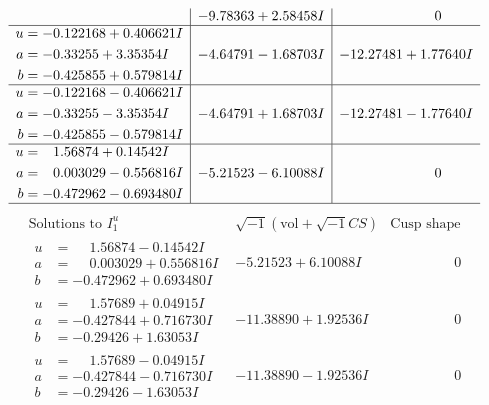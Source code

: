 \documentclass[1p]{elsarticle_modified}
\theoremstyle{definition}
\newcommand{\I}{\sqrt{-1}}
\begin{document}
$$\begin{array}{c|c|c}
 & -9.78363 + 2.58458 I & \phantom{-0.000000 } 0 \\ \hline\begin{aligned}
u &= -0.122168 + 0.406621 I \\
a &= -0.33255 + 3.35354 I \\
b &= -0.425855 + 0.579814 I\end{aligned}
 & -4.64791 - 1.68703 I & -12.27481 + 1.77640 I \\ \hline\begin{aligned}
u &= -0.122168 - 0.406621 I \\
a &= -0.33255 - 3.35354 I \\
b &= -0.425855 - 0.579814 I\end{aligned}
 & -4.64791 + 1.68703 I & -12.27481 - 1.77640 I \\ \hline\begin{aligned}
u &= \phantom{-}1.56874 + 0.14542 I \\
a &= \phantom{-}0.003029 - 0.556816 I \\
b &= -0.472962 - 0.693480 I\end{aligned}
 & -5.21523 - 6.10088 I & \phantom{-0.000000 } 0\\
 \hline 
 \end{array}$$\newpage$$\begin{array}{c|c|c}  
\text{Solutions to }I^u_{1}& \I (\text{vol} + \sqrt{-1}CS) & \text{Cusp shape}\\
 \hline 
\begin{aligned}
u &= \phantom{-}1.56874 - 0.14542 I \\
a &= \phantom{-}0.003029 + 0.556816 I \\
b &= -0.472962 + 0.693480 I\end{aligned}
 & -5.21523 + 6.10088 I & \phantom{-0.000000 } 0 \\ \hline\begin{aligned}
u &= \phantom{-}1.57689 + 0.04915 I \\
a &= -0.427844 + 0.716730 I \\
b &= -0.29426 + 1.63053 I\end{aligned}
 & -11.38890 + 1.92536 I & \phantom{-0.000000 } 0 \\ \hline\begin{aligned}
u &= \phantom{-}1.57689 - 0.04915 I \\
a &= -0.427844 - 0.716730 I \\
b &= -0.29426 - 1.63053 I\end{aligned}
 & -11.38890 - 1.92536 I & \phantom{-0.000000 } 0 \\ \hline\begin{aligned}

\end{aligned}
\end{array}$$
\end{document}
